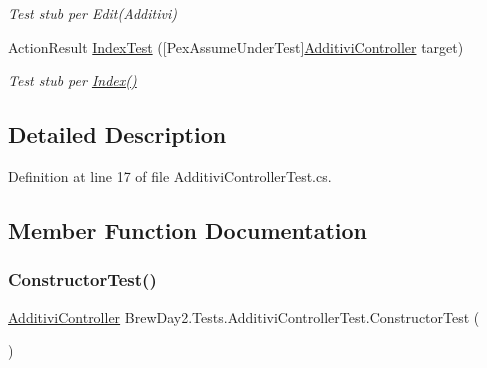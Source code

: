 \begin{DoxyCompactItemize}
\begin{DoxyCompactList}\small\item\em Test stub per Edit(\+Additivi)\end{DoxyCompactList}\item 
Action\+Result \mbox{\hyperlink{class_brew_day2_1_1_tests_1_1_additivi_controller_test_a1bd4b734b576e17e441acfb2b4880704}{Index\+Test}} (\mbox{[}Pex\+Assume\+Under\+Test\mbox{]}\mbox{\hyperlink{class_brew_day2_1_1_controllers_1_1_additivi_controller}{Additivi\+Controller}} target)
\begin{DoxyCompactList}\small\item\em Test stub per \mbox{\hyperlink{class_brew_day2_1_1_tests_1_1_additivi_controller_test_a58526dd197cdb5d5113c2a84b6687075}{Index()}}\end{DoxyCompactList}\end{DoxyCompactItemize}


\subsection{Detailed Description}


Definition at line 17 of file Additivi\+Controller\+Test.\+cs.



\subsection{Member Function Documentation}
\mbox{\label{class_brew_day2_1_1_tests_1_1_additivi_controller_test_a90683ef586b3f08ba6ac453f1037d264}} 
\subsubsection{\texorpdfstring{Constructor\+Test()}{ConstructorTest()}}
{\footnotesize\ttfamily \mbox{\hyperlink{class_brew_day2_1_1_controllers_1_1_additivi_controller}{Additivi\+Controller}} Brew\+Day2.\+Tests.\+Additivi\+Controller\+Test.\+Constructor\+Test (\begin{DoxyParamCaption}{ }\end{DoxyParamCaption})}



